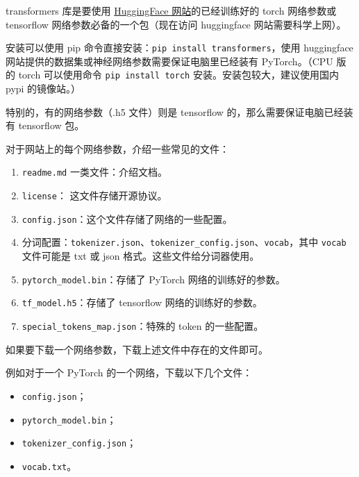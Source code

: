 
\begin{issues}
\issueDraft
\end{issues}

transformers 库是要使用 \href{https://huggingface.co}{HuggingFace 网站}的已经训练好的 torch 网络参数或 tensorflow 网络参数必备的一个包（现在访问 huggingface 网站需要科学上网）。

安装可以使用 pip 命令直接安装：\verb`pip install transformers`，使用 huggingface 网站提供的数据集或神经网络参数需要保证电脑里已经装有 PyTorch。（CPU 版的 torch 可以使用命令 \verb`pip install torch` 安装。安装包较大，建议使用国内 pypi 的镜像站。）

特别的，有的网络参数（.h5 文件）则是 tensorflow 的，那么需要保证电脑已经装有 tensorflow 包。

对于网站上的每个网络参数，介绍一些常见的文件：
\begin{enumerate}
\item \verb`readme.md` 一类文件：介绍文档。
\item \verb`license`： 这文件存储开源协议。
\item \verb`config.json`：这个文件存储了网络的一些配置。
\item 分词配置：\verb`tokenizer.json`、\verb`tokenizer_config.json`、\verb`vocab`，其中 \verb`vocab` 文件可能是 txt 或 json 格式。这些文件给分词器使用。
\item \verb`pytorch_model.bin`：存储了 PyTorch 网络的训练好的参数。
\item \verb`tf_model.h5`：存储了 tensorflow 网络的训练好的参数。
\item \verb`special_tokens_map.json`：特殊的 token 的一些配置。
\end{enumerate}

如果要下载一个网络参数，下载上述文件中存在的文件即可。

例如对于一个 PyTorch 的一个网络，下载以下几个文件：
\begin{itemize}
\item \verb`config.json`；
\item \verb`pytorch_model.bin`；
\item \verb`tokenizer_config.json`；
\item \verb`vocab.txt`。
\end{itemize}

